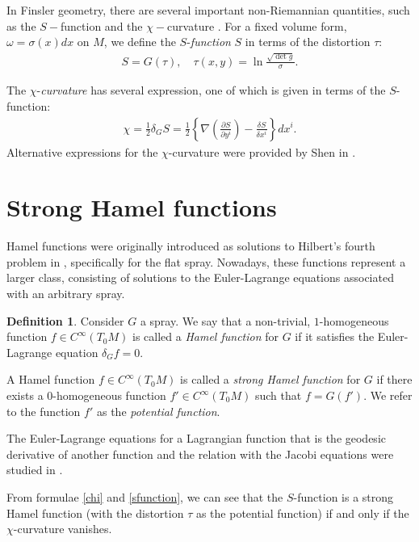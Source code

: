 \documentclass[oneside,english]{amsart}
\theoremstyle{definition}
\newtheorem{definition}[theorem]{Definition}
\theoremstyle{plain}
\theoremstyle{plain}
\theoremstyle{plain}
\theoremstyle{remark}
\theoremstyle{remark}
\theoremstyle{remark}
\begin{document}
In Finsler geometry, there are several important non-Riemannian quantities, such as the $S-$function and the $\chi-$curvature \cite{Shen21}. For a fixed volume form, $\omega=\sigma(x)dx$ on $M$, we define the $S$-\emph{function} $S$ in terms of the distortion $\tau$:
\begin{eqnarray}
S=G\left(\tau\right), \quad \tau(x,y)=\ln\frac{\sqrt{\det g}}{\sigma}. \label{sfunction}
\end{eqnarray}  

The $\chi$-\emph{curvature} has several expression, one of which is given in terms of the $S$-function:
\begin{eqnarray}
\chi=\frac{1}{2}\delta_GS=\frac{1}{2}\left\{\nabla\left(\frac{\partial
  S}{\partial y^i}\right)-\frac{\delta S}{\delta x^i}\right\}dx^i.\label{chi}
\end{eqnarray}
Alternative expressions for the $\chi$-curvature were provided by Shen in \cite{Shen21}.

\section{Strong Hamel functions}

Hamel functions were originally introduced as solutions to Hilbert's fourth problem in \cite{Hamel03}, specifically for the flat spray. Nowadays, these functions represent a larger class, consisting of solutions to the Euler-Lagrange equations associated with an arbitrary spray.   

\begin{definition} \label{dfn:Hamel}
Consider $G$ a spray. We say that a non-trivial, $1$-homogeneous function $f\in C^{\infty}(T_0M)$ is called a \emph{Hamel function} for $G$ if it satisfies the Euler-Lagrange equation $\delta_Gf=0$. 

A Hamel function $f\in C^{\infty}(T_0M)$ is called a \emph{strong Hamel function} for $G$ if there exists a $0$-homogeneous function $f'\in C^{\infty}(T_0M)$ such that $f=G(f')$. We refer to the function $f'$ as the \emph{potential function}. 
\end{definition}
The Euler-Lagrange equations for a Lagrangian function that is the geodesic derivative of another function and the relation with the Jacobi equations were studied in \cite{CM91}. 

From formulae \eqref{chi} and \eqref{sfunction}, we can see that the $S$-function is a strong Hamel function (with the distortion $\tau$ as the potential function) if and only if the $\chi$-curvature vanishes.
\end{document}
